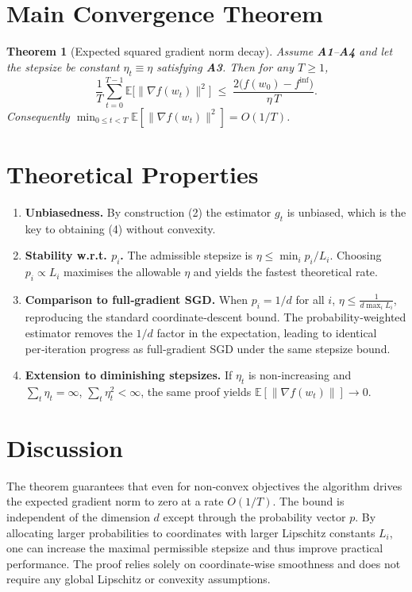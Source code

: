 \documentclass{article}
\newcommand{\EE}{\mathbb{E}}
\newtheorem{theorem}{Theorem}
\begin{document}
\section*{Main Convergence Theorem}
\begin{theorem}[Expected squared gradient norm decay]\label{thm:main}
Assume \textbf{A1}–\textbf{A4} and let the stepsize be constant $\eta_t\equiv\eta$ satisfying \textbf{A3}. Then for any $T\ge1$,
\[
\frac{1}{T}\sum_{t=0}^{T-1}\EE\!\bigl[\|\nabla f(w_t)\|^2\bigr]
\;\le\;
\frac{2\bigl(f(w_0)-f^{\inf}\bigr)}{\eta\,T}.
\tag{4}
\]
Consequently $\min_{0\le t<T}\EE[\|\nabla f(w_t)\|^2]=O(1/T)$.
\end{theorem}

\section*{Theoretical Properties}
\begin{enumerate}[label=\textbf{P\arabic*.},leftmargin=*,nosep]
\item \textbf{Unbiasedness.}  By construction (2) the estimator $g_t$ is unbiased, which is the key to obtaining (4) without convexity.
\item \textbf{Stability w.r.t. $p_i$.}  
The admissible stepsize is $\eta\le\min_i p_i/L_i$.  Choosing $p_i\propto L_i$ maximises the allowable $\eta$ and yields the fastest theoretical rate.
\item \textbf{Comparison to full‑gradient SGD.}  
When $p_i=1/d$ for all $i$, $\eta\le\frac{1}{d\max_i L_i}$, reproducing the standard coordinate‑descent bound.  The probability‑weighted estimator removes the $1/d$ factor in the expectation, leading to identical per‑iteration progress as full‑gradient SGD under the same stepsize bound.
\item \textbf{Extension to diminishing stepsizes.}  
If $\eta_t$ is non‑increasing and $\sum_{t}\eta_t=\infty$, $\sum_{t}\eta_t^{2}<\infty$, the same proof yields $\EE[\|\nabla f(w_t)\|]\to0$.
\end{enumerate}

\section*{Discussion}
The theorem guarantees that even for non‑convex objectives the algorithm drives the expected gradient norm to zero at a rate $O(1/T)$.  The bound is independent of the dimension $d$ except through the probability vector $p$.  By allocating larger probabilities to coordinates with larger Lipschitz constants $L_i$, one can increase the maximal permissible stepsize and thus improve practical performance.  The proof relies solely on coordinate‑wise smoothness and does not require any global Lipschitz or convexity assumptions.
\end{document}
